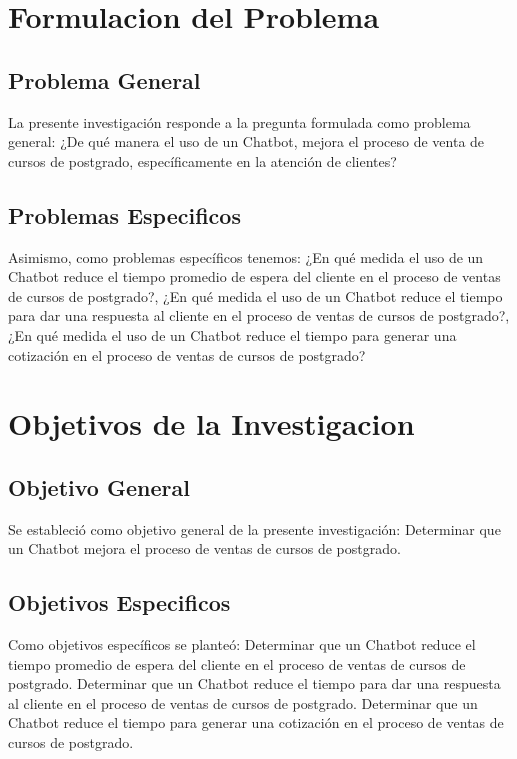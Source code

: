 \documentclass[10pt,a4paper]{article}
\begin{document}
	\section{Formulacion del Problema}
		    
	\subsection{Problema General}

	La presente investigación responde a la pregunta formulada como problema  general: ¿De qué manera el uso de un Chatbot, mejora el proceso de venta de cursos de postgrado, específicamente en la atención de clientes?
 

    \subsection{Problemas Especificos}
	Asimismo, como problemas específicos tenemos: ¿En qué medida el uso de  un Chatbot reduce el tiempo promedio de espera del cliente en el proceso de ventas  de cursos de postgrado?, ¿En qué medida el uso  de un Chatbot reduce el tiempo para dar una respuesta al cliente en el proceso de  ventas de cursos de postgrado?, ¿En qué medida  el uso de un Chatbot reduce el tiempo para generar una cotización en el proceso de  ventas de cursos de postgrado?

 		    
	\section{Objetivos de la Investigacion}
		    
	\subsection{Objetivo General}

	Se estableció como objetivo general de la presente investigación: Determinar que un Chatbot mejora el proceso de ventas de cursos de postgrado.

 

    \subsection{Objetivos Especificos}
	Como objetivos específicos se planteó: Determinar que un Chatbot reduce el tiempo promedio de espera del cliente en el proceso de ventas de cursos de postgrado. Determinar que un Chatbot reduce el tiempo para dar una respuesta al cliente en el proceso de ventas de cursos de postgrado. Determinar que un Chatbot reduce el tiempo para generar una cotización en el proceso de ventas de cursos de postgrado.
\end{document}
